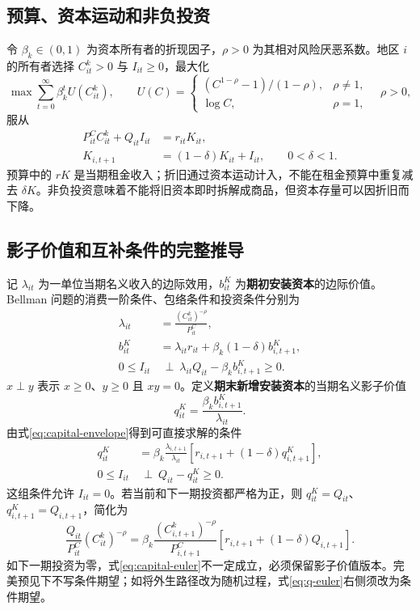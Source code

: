 \documentclass[UTF8,a4paper,zihao=-4,fontset=windows]{ctexart}
\numberwithin{equation}{section}
\newcommand{\pc}{P^{C}}
\newcommand{\invp}{Q}
\begin{document}
\subsection{预算、资本运动和非负投资}
令 $\beta_k\in(0,1)$ 为资本所有者的折现因子，$\rho>0$ 为其相对风险厌恶系数。地区 $i$ 的所有者选择 $C^k_{it}>0$ 与 $I_{it}\geq0$，最大化
\begin{equation}
 \max\sum_{t=0}^{\infty}\beta_k^t U(C^k_{it}),\qquad
 U(C)=\begin{cases}(C^{1-\rho}-1)/(1-\rho),&\rho\neq1,\\
 \log C,&\rho=1,\end{cases}
 \quad \rho>0,
 \label{eq:capital-objective}
\end{equation}
服从
\begin{align}
 \pc_{it}C^k_{it}+\invp_{it}I_{it}&=r_{it}K_{it},\label{eq:capital-budget}\\
 K_{i,t+1}&=(1-\delta)K_{it}+I_{it},\qquad 0<\delta<1.
 \label{eq:capital-law}
\end{align}
预算中的 $rK$ 是当期租金收入；折旧通过资本运动计入，不能在租金预算中重复减去 $\delta K$。非负投资意味着不能将旧资本即时拆解成商品，但资本存量可以因折旧而下降。

\subsection{影子价值和互补条件的完整推导}
记 $\lambda_{it}$ 为一单位当期名义收入的边际效用，$b^K_{it}$ 为\textbf{期初安装资本}的边际价值。Bellman 问题的消费一阶条件、包络条件和投资条件分别为
\begin{align}
 \lambda_{it}&=\frac{(C^k_{it})^{-\rho}}{\pc_{it}},\label{eq:lambda}\\
 b^K_{it}&=\lambda_{it}r_{it}+\beta_k(1-\delta)b^K_{i,t+1},
 \label{eq:capital-envelope}\\
 0\leq I_{it}&\ \perp\ 
 \lambda_{it}\invp_{it}-\beta_kb^K_{i,t+1}\geq0.
 \label{eq:investment-kt}
\end{align}
$x\perp y$ 表示 $x\geq0$、$y\geq0$ 且 $xy=0$。定义\textbf{期末新增安装资本}的当期名义影子价值
\begin{equation}
 q^K_{it}=\frac{\beta_kb^K_{i,t+1}}{\lambda_{it}}.
\end{equation}
由式\eqref{eq:capital-envelope}得到可直接求解的条件
\begin{align}
 q^K_{it}&=\beta_k\frac{\lambda_{i,t+1}}{\lambda_{it}}
 \left[r_{i,t+1}+(1-\delta)q^K_{i,t+1}\right],
 \label{eq:q-euler}\\
 0\leq I_{it}&\ \perp\ \invp_{it}-q^K_{it}\geq0.
 \label{eq:q-complementarity}
\end{align}
这组条件允许 $I_{it}=0$。若当前和下一期投资都严格为正，则 $q^K_{it}=\invp_{it}$、$q^K_{i,t+1}=\invp_{i,t+1}$，简化为
\begin{equation}
 \frac{\invp_{it}}{\pc_{it}}(C^k_{it})^{-\rho}
 =\beta_k\frac{(C^k_{i,t+1})^{-\rho}}{\pc_{i,t+1}}
 \left[r_{i,t+1}+(1-\delta)\invp_{i,t+1}\right].
 \label{eq:capital-euler}
\end{equation}
如下一期投资为零，式\eqref{eq:capital-euler}不一定成立，必须保留影子价值版本。完美预见下不写条件期望；如将外生路径改为随机过程，式\eqref{eq:q-euler}右侧须改为条件期望。
\end{document}
